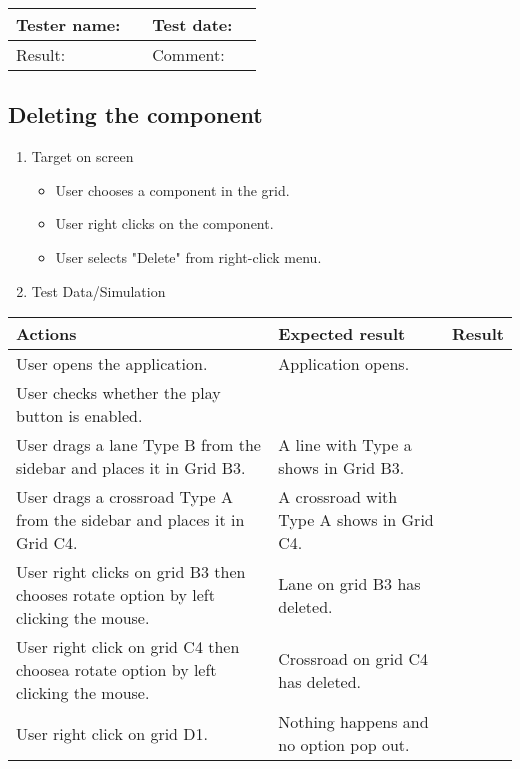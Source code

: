 		


\begin{tabularx}{\textwidth}{|p{3cm}X|p{3cm}X|}\hline
	Tester name: &  & Test date: & \\\hline
	Result: &   \pass & Comment: & \\\hline
\end{tabularx}

\newpage

\subsection{Deleting the component}

\begin{enumerate}
	
	\item Target on screen
	\begin{itemize}
		\item User chooses a component in the grid.
		\item User right clicks on the component.
		\item User selects "Delete" from right-click menu.
	\end{itemize}
	\item Test Data/Simulation
\end{enumerate}	
	\begin{tabularx}{\textwidth}{|X|X|p{2.5cm}|}\hline
		Actions & Expected result & Result \\\hline
		User opens the application.& Application opens. &  \pass \\\hline
		User checks whether the play button is enabled. & &  \pass \\\hline
		User drags a lane Type B from the sidebar and places it in Grid B3. & A line with Type a shows in Grid B3. & \pass \\\hline
		User drags a crossroad Type A from the sidebar and places it in Grid C4. & A crossroad with Type A shows in Grid C4. & \pass \\\hline
		User right clicks on grid B3 then chooses rotate option by left clicking the mouse.  & Lane on grid B3 has deleted.  & \pass \\\hline
		User right click on grid C4 then choosea rotate option by left clicking the mouse. & Crossroad on grid C4 has deleted. & \pass \\\hline
		User right click on grid D1. & Nothing happens and no option pop out. & \pass \\\hline
	\end{tabularx}
	


